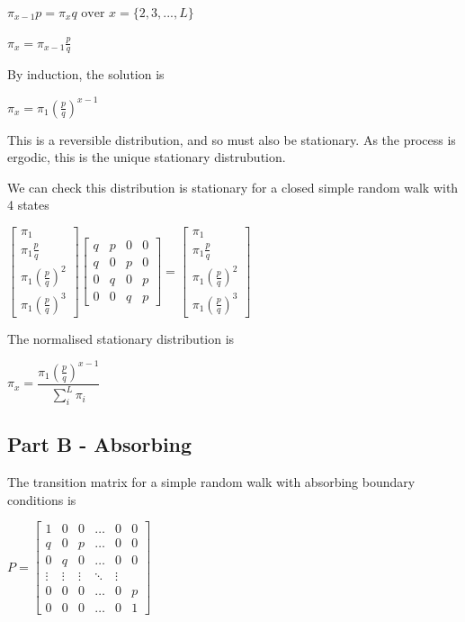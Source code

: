 \documentclass{article}
\begin{document}
$\pi_{x-1} p = \pi_x q \text{ over } x = \{2,3,..., L\}$


$ \pi_x = \pi_{x-1} \frac{p}{q} $

By induction, the solution is

$\pi_x = \pi_1 (\frac{p}{q})^{x-1}$

This is a reversible distribution, and so must also be stationary. As the process is ergodic, this is the unique stationary distrubution.

We can check this distribution is stationary for a closed simple random walk with 4 states

\bigskip

 $\begin{bmatrix}
    \pi_1 \\
    \pi_1\frac{p}{q} \\
    \pi_1(\frac{p}{q})^2 \\
    \pi_1(\frac{p}{q})^3 
\end{bmatrix}
\begin{bmatrix}
    q & p & 0 & 0 \\
    q & 0 & p & 0\\
    0 & q & 0 & p\\
    0 & 0 & q & p
\end{bmatrix} = 
\begin{bmatrix}
    \pi_1 \\
    \pi_1\frac{p}{q} \\
    \pi_1(\frac{p}{q})^2 \\
    \pi_1(\frac{p}{q})^3 
\end{bmatrix}$

\bigskip

The normalised stationary distribution is

$\pi_x = \dfrac{\pi_1(\frac{p}{q})^{x-1}}{\sum_i^L{\pi_i}}$

\subsection{Part B - Absorbing}

The transition matrix for a simple random walk with absorbing boundary conditions is

\bigskip

$P = \begin{bmatrix}
    1 & 0 & 0 & \dots  & 0 & 0 \\
    q & 0 & p & \dots  & 0 & 0\\
    0 & q & 0 & \dots  & 0 & 0\\
    \vdots & \vdots & \vdots & \ddots & \vdots \\
    0 & 0 & 0 & \dots & 0 & p \\
    0 & 0 & 0 & \dots & 0 & 1
\end{bmatrix}$
\end{document}
